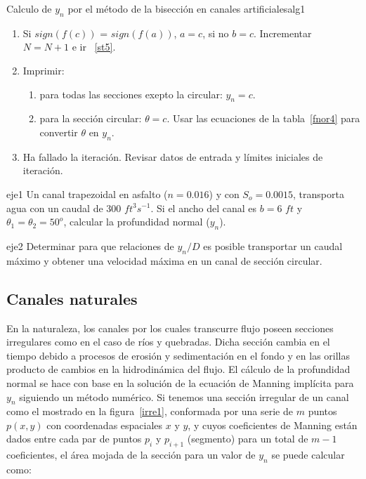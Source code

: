\documentclass[11pt, oneside]{article}
\begin{document}
\begin{alg}{Calculo de $y_n$ por el m\'etodo de la bisecci\'on en canales artificiales}{alg1}
\begin{enumerate}
\item \label{st4} Si $sign(f(c))$ = $sign(f(a))$, $a=c$, si no $b=c$. Incrementar $N=N+1$ e ir ~\ref{st5}. 

\item \label{st2} Imprimir:
\begin{enumerate}
\item para todas las secciones exepto la circular: $y_n = c$.
\item para la secci\'on circular: $\theta = c$. Usar las ecuaciones de la tabla~\ref{fnor4} para convertir $\theta$ en $y_n$.
\end{enumerate}

\item \label{st3} Ha fallado la iteraci\'on. Revisar datos de entrada y l\'imites iniciales de iteraci\'on.

\end{enumerate}
\end{alg}

\begin{eje}{}{eje1}
Un canal trapezoidal en asfalto ($n=0.016$) y con $S_o = 0.0015$, transporta agua con un caudal de 300 $ft^3 s^{-1}$. Si el ancho del canal es $b=6$ $ft$ y $\theta_1 = \theta_2 = 50^o$, calcular la profundidad normal ($y_n$).
\end{eje}

\begin{eje}{}{eje2}
Determinar para que relaciones de $y_n /D$ es posible transportar un caudal m\'aximo y obtener una velocidad m\'axima en un canal de secci\'on circular.
\end{eje}

\subsection{Canales naturales}
En la naturaleza, los canales por los cuales transcurre flujo poseen secciones irregulares como en el caso de ríos y quebradas. Dicha secci\'on cambia en el tiempo debido a procesos de erosión y sedimentaci\'on en el fondo y en las orillas producto de cambios en la hidrodin\'amica del flujo. El c\'alculo de la profundidad normal se hace con base en la soluci\'on de la ecuaci\'on de Manning implícita para $y_n$ siguiendo un m\'etodo num\'erico. Si tenemos una secci\'on irregular de un canal como el mostrado en la figura~\ref{irre1}, conformada por una serie de $m$ puntos $p(x,y)$ con coordenadas espaciales $x$ y $y$, y cuyos coeficientes de Manning están dados entre cada par de puntos $p_i$ y $p_{i+1}$ (segmento) para un total de $m-1$ coeficientes, el \'area mojada de la secci\'on para un valor de $y_n$ se puede calcular como:
\end{document}
